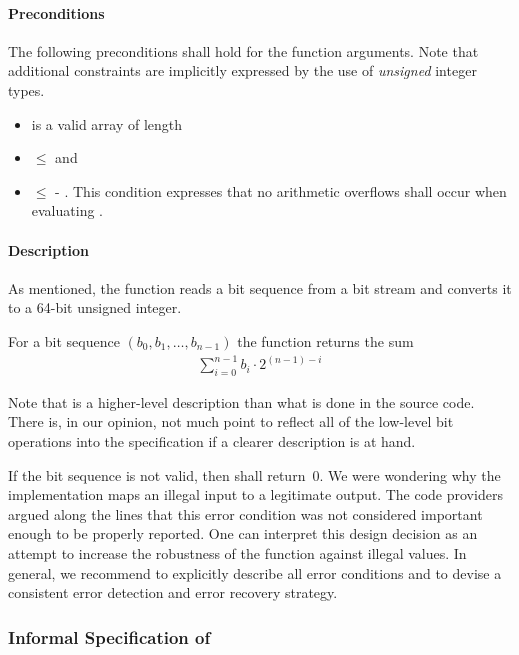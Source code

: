 \paragraph{Preconditions}
The following preconditions shall hold for the function arguments.
Note that additional constraints are implicitly expressed by the use
of \emph{unsigned} integer types.

\begin{itemize}
\item {} is a valid array of length 

\item {} $\leq$  and

\item {} $\leq$  - .
      This condition expresses that no arithmetic overflows shall occur
      when evaluating .
\end{itemize}

\paragraph{Description}
As mentioned, the function \peek reads a bit sequence from a bit stream
and converts it to a 64-bit unsigned integer.

For a bit sequence $(b_0, b_1,\ldots,b_{n - 1})$ the function \peek returns the sum
\begin{align}
    \sum_{i=0}^{n-1} b_i \cdot 2^{(n - 1) - i} 
\end{align}

Note that is a higher-level description than what is done in the source code.
There is, in our opinion, not much point to reflect all of the low-level bit operations
into the specification if a clearer description is at hand.

If the bit sequence is not valid, then \peek shall return~0.
We were wondering why the implementation maps an illegal input to a legitimate output.
The code providers argued along the lines that this error condition was not
considered important enough to be properly reported.
One can interpret this design decision as an attempt to increase the
robustness of the function against illegal values.
In general, we recommend to explicitly describe all error conditions
and to devise a consistent error detection and error recovery strategy.


\subsubsection{Informal Specification of \poke}

